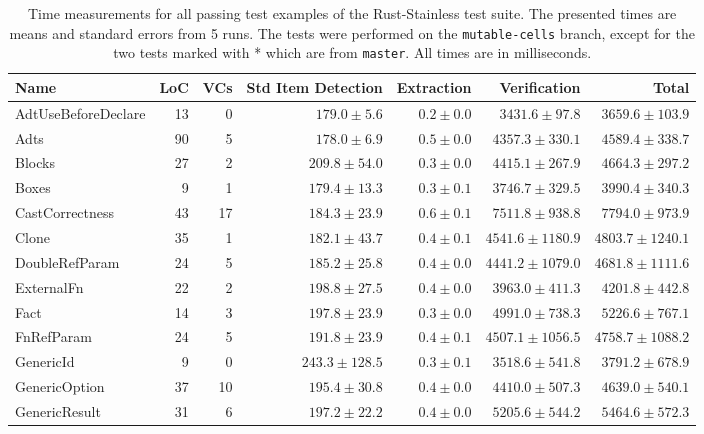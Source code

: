 \begin{table}
\centering
\caption{Time measurements for all passing test examples of the Rust-Stainless test suite. The presented times are means and standard errors from 5 runs. The tests were performed on the \texttt{mutable-cells} branch, except for the two tests marked with * which are from \texttt{master}. All times are in milliseconds.}
\label{measurements}
\begin{tabular}{lrrrrrr}
\toprule
Name &  LoC &  VCs & Std Item Detection &   Extraction &       Verification &              Total \\
\midrule
AdtUseBeforeDeclare      &   13 &    0 &      $179.0\pm5.6$ &  $0.2\pm0.0$ &    $3431.6\pm97.8$ &   $3659.6\pm103.9$ \\
Adts                     &   90 &    5 &      $178.0\pm6.9$ &  $0.5\pm0.0$ &   $4357.3\pm330.1$ &   $4589.4\pm338.7$ \\
Blocks                   &   27 &    2 &     $209.8\pm54.0$ &  $0.3\pm0.0$ &   $4415.1\pm267.9$ &   $4664.3\pm297.2$ \\
Boxes                    &    9 &    1 &     $179.4\pm13.3$ &  $0.3\pm0.1$ &   $3746.7\pm329.5$ &   $3990.4\pm340.3$ \\
CastCorrectness          &   43 &   17 &     $184.3\pm23.9$ &  $0.6\pm0.1$ &   $7511.8\pm938.8$ &   $7794.0\pm973.9$ \\
Clone                    &   35 &    1 &     $182.1\pm43.7$ &  $0.4\pm0.1$ &  $4541.6\pm1180.9$ &  $4803.7\pm1240.1$ \\
DoubleRefParam           &   24 &    5 &     $185.2\pm25.8$ &  $0.4\pm0.0$ &  $4441.2\pm1079.0$ &  $4681.8\pm1111.6$ \\
ExternalFn               &   22 &    2 &     $198.8\pm27.5$ &  $0.4\pm0.0$ &   $3963.0\pm411.3$ &   $4201.8\pm442.8$ \\
Fact                     &   14 &    3 &     $197.8\pm23.9$ &  $0.3\pm0.0$ &   $4991.0\pm738.3$ &   $5226.6\pm767.1$ \\
FnRefParam               &   24 &    5 &     $191.8\pm23.9$ &  $0.4\pm0.1$ &  $4507.1\pm1056.5$ &  $4758.7\pm1088.2$ \\
GenericId                &    9 &    0 &    $243.3\pm128.5$ &  $0.3\pm0.1$ &   $3518.6\pm541.8$ &   $3791.2\pm678.9$ \\
GenericOption            &   37 &   10 &     $195.4\pm30.8$ &  $0.4\pm0.0$ &   $4410.0\pm507.3$ &   $4639.0\pm540.1$ \\
GenericResult            &   31 &    6 &     $197.2\pm22.2$ &  $0.4\pm0.0$ &   $5205.6\pm544.2$ &   $5464.6\pm572.3$ \\

\end{tabular}
\end{table}

